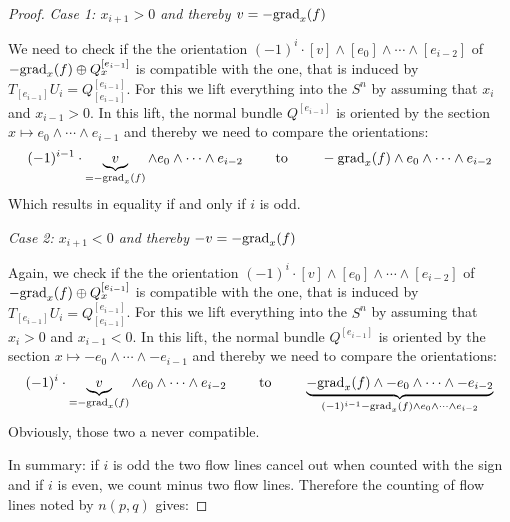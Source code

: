 \begin{example}
\begin{proof}
			\textit{ Case 1: $x_{i+1}>0$ and thereby $v=-\mathrm{grad}_x(f)$}

			We need to check if the the orientation $(-1)^i\cdot [v]\wedge [e_0] \wedge \cdots \wedge [e_{i-2}] $ of $-\mathrm{grad}_x(f)\oplus Q_x^{[e_{i-1}]}$ is compatible with the one, that is induced by $T_{[e_{i-1}]}U_i=Q^{[e_{i-1}]}_{[e_{i-1}]}$. For this we lift everything into the $S^n$ by assuming that $x_i$ and $x_{i-1}>0$. In this lift, the normal bundle $Q^{[e_{i-1}]}$ is oriented by the section $x\mapsto  e_0\wedge \cdots \wedge e_{i-1}$ and thereby we need to compare the orientations: 
			\begin{equation*}
				(-1)^{i-1}\cdot \underbrace{v}_{=-\mathrm{grad}_x(f)}\wedge e_0 \wedge \cdots \wedge e_{i-2} \qquad \text{ to }\qquad  -\mathrm{grad}_x(f)\wedge e_0 \wedge \cdots \wedge e_{i-2}
			\end{equation*}
			Which results in equality if and only if $i$ is odd.
			
			\textit{ Case 2: $x_{i+1}<0$ and thereby $-v=-\mathrm{grad}_x(f)$}

			Again, we check if the the orientation $(-1)^i\cdot [v]\wedge [e_0] \wedge \cdots \wedge [e_{i-2}] $ of $-\mathrm{grad}_x(f)\oplus Q_x^{[e_{i-1}]}$ is compatible with the one, that is induced by $T_{[e_{i-1}]}U_i=Q^{[e_{i-1}]}_{[e_{i-1}]}$.  For this we lift everything into the $S^n$ by assuming that $x_i>0$ and $x_{i-1}<0$. In this lift, the normal bundle $Q^{[e_{i-1}]}$ is oriented by the section $x\mapsto  -e_0\wedge \cdots \wedge -e_{i-1}$ and thereby we need to compare the orientations: 
			\begin{equation*}
				(-1)^{i}\cdot \underbrace{v}_{=-\mathrm{grad}_x(f)}\wedge e_0 \wedge \cdots \wedge e_{i-2} \qquad \text{ to }\qquad  \underbrace{-\mathrm{grad}_x(f)\wedge -e_0 \wedge \cdots \wedge -e_{i-2}}_{(-1)^{i-1}-\mathrm{grad}_x(f)\wedge e_0 \wedge \cdots \wedge e_{i-2}}
			\end{equation*}
			Obviously, those two a never compatible.
			
			
	In summary: if $i$ is odd the two flow lines cancel out when counted with the sign and if $i$ is even, we count minus two flow lines. Therefore the counting of flow lines noted by $n(p,q)$ gives: 
			

\end{proof}
\end{example}
